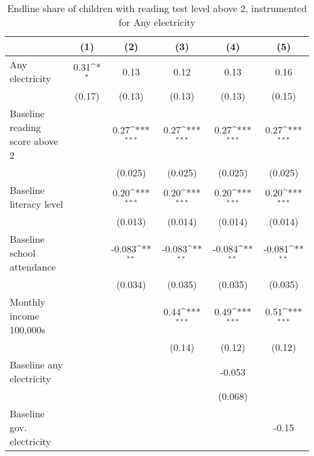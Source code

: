 \begin{table}[htbp]\centering
\def\sym#1{\ifmmode^{#1}\else\(^{#1}\)\fi}
\caption{Endline share of children with reading test level above 2, instrumented for Any electricity}
\begin{tabular*}{1\hsize}{@{\hskip\tabcolsep\extracolsep\fill}l*{5}{c}}
\toprule
                &\multicolumn{1}{c}{(1)}         &\multicolumn{1}{c}{(2)}         &\multicolumn{1}{c}{(3)}         &\multicolumn{1}{c}{(4)}         &\multicolumn{1}{c}{(5)}         \\
\midrule
Any electricity &     0.31\sym{*}  &     0.13         &     0.12         &     0.13         &     0.16         \\
                &   (0.17)         &   (0.13)         &   (0.13)         &   (0.13)         &   (0.15)         \\
Baseline reading score above 2&                  &     0.27\sym{***}&     0.27\sym{***}&     0.27\sym{***}&     0.27\sym{***}\\
                &                  &  (0.025)         &  (0.025)         &  (0.025)         &  (0.025)         \\
Baseline literacy level&                  &     0.20\sym{***}&     0.20\sym{***}&     0.20\sym{***}&     0.20\sym{***}\\
                &                  &  (0.013)         &  (0.014)         &  (0.014)         &  (0.014)         \\
Baseline school attendance&                  &   -0.083\sym{**} &   -0.083\sym{**} &   -0.084\sym{**} &   -0.081\sym{**} \\
                &                  &  (0.034)         &  (0.035)         &  (0.035)         &  (0.035)         \\
Monthly income 100,000s&                  &                  &     0.44\sym{***}&     0.49\sym{***}&     0.51\sym{***}\\
                &                  &                  &   (0.14)         &   (0.12)         &   (0.12)         \\
Baseline any electricity&                  &                  &                  &   -0.053         &                  \\
                &                  &                  &                  &  (0.068)         &                  \\
Baseline gov. electricity&                  &                  &                  &                  &    -0.15         \\

\end{tabular*}
\end{table}
